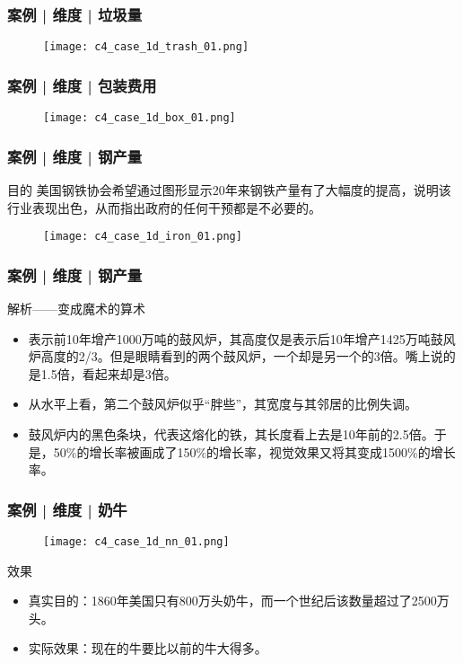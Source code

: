\begin{frame}
  \frametitle{案例 | 维度 | 垃圾量}
  \begin{figure}
    \centering
    \texttt{[image: c4\_case\_1d\_trash\_01.png]}
  \end{figure}
\end{frame}

\begin{frame}
  \frametitle{案例 | 维度 | 包装费用}
  \begin{figure}
    \centering
    \texttt{[image: c4\_case\_1d\_box\_01.png]}
  \end{figure}
\end{frame}

\begin{frame}
  \frametitle{案例 | 维度 | 钢产量}
  \begin{block}{目的}
    美国钢铁协会希望通过图形显示20年来钢铁产量有了大幅度的提高，说明该行业表现出色，从而指出政府的任何干预都是不必要的。
  \end{block}
  \vspace{-0.5em}
  \begin{figure}
    \centering
    \texttt{[image: c4\_case\_1d\_iron\_01.png]}
  \end{figure}
\end{frame}

\begin{frame}
  \frametitle{案例 | 维度 | 钢产量}
  \begin{block}{解析——变成魔术的算术}
    \begin{itemize}
      \item 表示前10年增产1000万吨的鼓风炉，其高度仅是表示后10年增产1425万吨鼓风炉高度的2/3。但是眼睛看到的两个鼓风炉，一个却是另一个的3倍。嘴上说的是1.5倍，看起来却是3倍。
      \item 从水平上看，第二个鼓风炉似乎“胖些”，其宽度与其邻居的比例失调。
      \item 鼓风炉内的黑色条块，代表这熔化的铁，其长度看上去是10年前的2.5倍。于是，50\%的增长率被画成了150\%的增长率，视觉效果又将其变成1500\%的增长率。
    \end{itemize}
  \end{block}
\end{frame}

\begin{frame}
  \frametitle{案例 | 维度 | 奶牛}
  \begin{figure}
    \centering
    \texttt{[image: c4\_case\_1d\_nn\_01.png]}
  \end{figure}
  \vspace{-1em}
  \pause \pause \pause \pause
  \begin{block}{效果}
    \begin{itemize}
      \item 真实目的：1860年美国只有800万头奶牛，而一个世纪后该数量超过了2500万头。
      \item 实际效果：现在的牛要比以前的牛大得多。
    \end{itemize}
  \end{block}
\end{frame}

